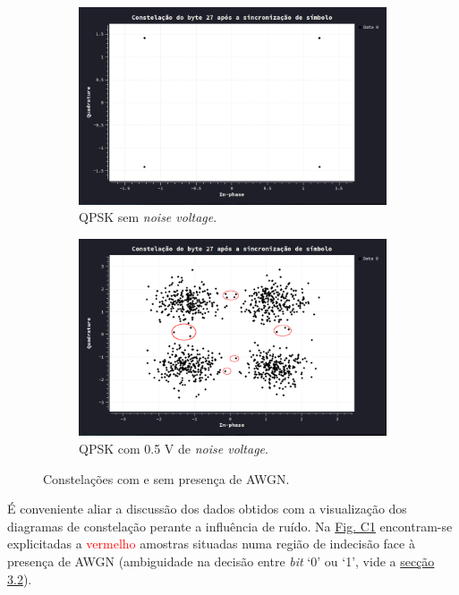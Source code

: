 \begin{figure}[ht]
\begin{subfigure}[b]{0.5\linewidth}
        \centering
        \includegraphics[width=0.8\linewidth]{img/conclusao/const-byte27-qpsk.png}
        \caption{QPSK sem \textit{noise voltage}.} 
        \label{fig:c} 
    \end{subfigure}%
    \begin{subfigure}[b]{0.5\linewidth}
        \centering
        \includegraphics[width=0.8\linewidth]{img/conclusao/const-byte27-qpsk-noisy.png} 
        \caption{QPSK com 0.5 V de \textit{noise voltage}.} 
        \label{fig:d} 
    \end{subfigure} 
    \caption{Constelações com e sem presença de AWGN.}
    \label{fig:multiplas}
\end{figure}

É conveniente aliar a discussão dos dados obtidos com a visualização dos diagramas de constelação perante a influência de ruído. Na \hyperref[fig:multiplas]{Fig. C1} encontram-se explicitadas a \textcolor{red}{vermelho} amostras situadas numa região de indecisão face à presença de AWGN (ambiguidade na decisão entre \textit{bit} `0' ou `1', vide a \hyperref[subsubsec:stream-to-bit]{secção 3.2}).

